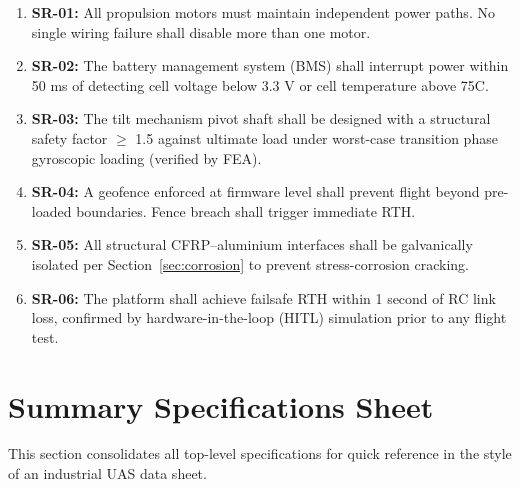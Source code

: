 \begin{enumerate}[noitemsep]
  \item \textbf{SR-01:} All propulsion motors must maintain independent power paths. No single wiring failure shall disable more than one motor.
  \item \textbf{SR-02:} The battery management system (BMS) shall interrupt power within 50 ms of detecting cell voltage below 3.3 V or cell temperature above 75\textdegree C.
  \item \textbf{SR-03:} The tilt mechanism pivot shaft shall be designed with a structural safety factor $\geq$ 1.5 against ultimate load under worst-case transition phase gyroscopic loading (verified by FEA).
  \item \textbf{SR-04:} A geofence enforced at firmware level shall prevent flight beyond pre-loaded boundaries. Fence breach shall trigger immediate RTH.
  \item \textbf{SR-05:} All structural CFRP--aluminium interfaces shall be galvanically isolated per Section~\ref{sec:corrosion} to prevent stress-corrosion cracking.
  \item \textbf{SR-06:} The platform shall achieve failsafe RTH within 1 second of RC link loss, confirmed by hardware-in-the-loop (HITL) simulation prior to any flight test.
\end{enumerate}

\section{Summary Specifications Sheet}

This section consolidates all top-level specifications for quick reference in the style of an industrial UAS data sheet.

